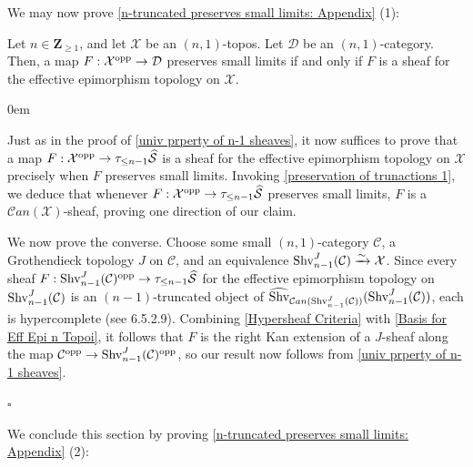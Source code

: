 \documentclass[10pt]{article}
\newcommand{\mS}{\mathcal S}
\newcommand{\C}{\mathcal C}
\newcommand{\cD}{\mathcal{D}}
\newcommand{\cX}{\mathcal{X}}
\newcommand{\ZZ}{\mathbb{Z}}
\def\ZZ{{\mathbf Z}}
\renewcommand{\qed}{\hfill$\square$}
\renewenvironment{proof}{\begin{addmargin}[1em]{0em}\begin{newproof}}{\end{newproof}\end{addmargin}\qed}
\theoremstyle{witharg}
\theoremstyle{witharg}
\theoremstyle{witharg2}
\begin{document}
\noindent We may now prove \ref{n-truncated preserves small limits: Appendix} (1):


\begin{corollary}{}\label{n topoi sheaves preserve small limits}

    Let $n\in \ZZ_{\geq 1}$, and let $\cX$ be an $(n,1)$-topos. Let $\cD$ be an $(n,1)$-category. Then, a map $F:\cX^{\textnormal{opp}}\rightarrow \cD$ preserves small limits if and only if $F$ is a sheaf for the effective epimorphism topology on $\cX$. 
    
\end{corollary}




\begin{proof}

    Just as in the proof of \ref{univ prperty of n-1 sheaves}, it now suffices to prove that a map $F:\cX^{\textnormal{opp}}\rightarrow \tau_{\leq n-1}\widehat{\mS}$ is a sheaf for the effective epimorphism topology on $\cX$ precisely when $F$ preserves small limits. Invoking \ref{preservation of trunactions 1}, we deduce that whenever $F:\cX^{\textnormal{opp}}\rightarrow \tau_{\leq n-1}\widehat{\mS}$ preserves small limits, $F$ is a $\C an(\cX)$-sheaf, proving one direction of our claim. 
    
    We now prove the converse. Choose some small $(n,1)$-category $\C$, a Grothendieck topology $J$ on $\C$, and an equivalence $\textnormal{Shv}^J_{n-1}(\C)\xrightarrow{\sim}\cX$. Since every sheaf $F:\textnormal{Shv}^J_{n-1}(\C)^{\textnormal{opp}}\rightarrow \tau_{\leq n-1}\widehat{\mS}$ for the effective epimorphism topology on $\textnormal{Shv}^J_{n-1}(\C)$ is an $(n-1)$-truncated object of $\widehat{\textnormal{Shv}}_{\C an (\textnormal{Shv}^J_{n-1}(\C))}(\textnormal{Shv}^J_{n-1}(\C))$, each is hypercomplete (see  6.5.2.9). Combining \ref{Hypersheaf Criteria} with \ref{Basis for Eff Epi n Topoi}, it follows that $F$ is the right Kan extension of a $J$-sheaf along the map $\C^{\textnormal{opp}}\rightarrow \textnormal{Shv}^J_{n-1}(\C)^{\textnormal{opp}}$, so our result now follows from \ref{univ prperty of n-1 sheaves}.
    
  
    
\end{proof}

\noindent We conclude this section by proving \ref{n-truncated preserves small limits: Appendix} (2):
\end{document}
